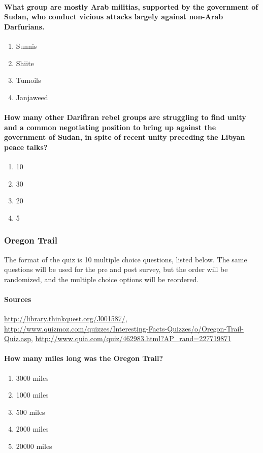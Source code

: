 		\paragraph{What group are mostly Arab militias, supported by the government of Sudan, who conduct vicious attacks largely against non-Arab Darfurians.}
			\begin{enumerate}
				\item Sunnis
				\item Shiite
				\item Tumoils
				\item Janjaweed
			\end{enumerate}

		\paragraph{How many other Darifiran rebel groups are struggling to find unity and a common negotiating position to bring up against the government of Sudan, in spite of recent unity preceding the Libyan peace talks?}
			\begin{enumerate}
				\item 10
				\item 30
				\item 20
				\item 5
			\end{enumerate}

	\subsubsection{Oregon Trail}
		The format of the quiz is 10 multiple choice questions, listed below. The same questions will be used for the pre and post survey, but the order will be randomized, and the multiple choice options will be reordered.
		\paragraph{Sources} \url{http://library.thinkquest.org/J001587/}, \url{http://www.quizmoz.com/quizzes/Interesting-Facts-Quizzes/o/Oregon-Trail-Quiz.asp}, \url{http://www.quia.com/quiz/462983.html?AP_rand=227719871}

		\paragraph{How many miles long was the Oregon Trail?}
			\begin{enumerate}	
				\item 3000 miles
				\item 1000 miles
				\item 500 miles
				\item 2000 miles
				\item 20000 miles
			\end{enumerate}

